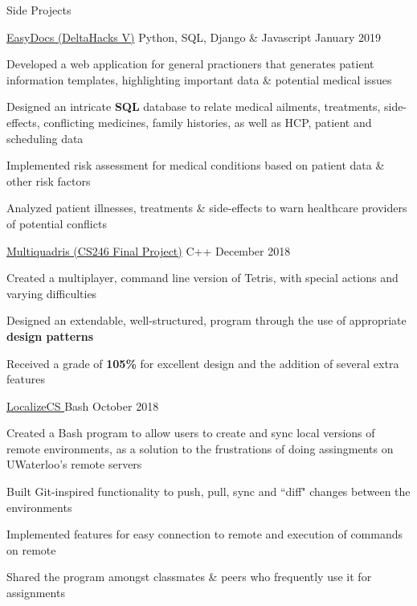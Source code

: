 \documentclass{resume} %
\begin{document}

\begin{rSection}{Side Projects}
    
    \begin{sideproject}
        {\href{https://github.com/wbhildeb/EasyDocs}{\faGithub{} EasyDocs (DeltaHacks V)}}
        {Python, SQL, Django \& Javascript}
        {January 2019}
        {
            \item Developed a web application for general practioners that generates patient information templates, highlighting important data \& potential medical issues
            \item Designed an intricate \textbf{SQL} database to relate medical ailments, treatments, side-effects, conflicting medicines, family histories, as well as HCP, patient and scheduling data
            \item Implemented risk assessment for medical conditions based on patient data \& other risk factors
            \item Analyzed patient illnesses, treatments \& side-effects to warn healthcare providers of potential conflicts
        }
    \end{sideproject}

    \begin{sideproject}
        {\href{https://github.com/wbhildeb/Multiquadris}{\faGithub{} Multiquadris (CS246 Final Project)}}
        {C++}
        {December 2018}
        {
            \item Created a multiplayer, command line version of Tetris, with special actions and varying difficulties
            \item Designed an extendable, well-structured, program through the use of appropriate \textbf{design patterns}
            \item Received a grade of \textbf{105\%} for excellent design and the addition of several extra features
        }
    \end{sideproject}

    \begin{sideproject}
        {\href{https://github.com/wbhildeb/localize-cs}{\faGithub{} LocalizeCS }}
        {Bash}
        {October 2018}
        {
            \item Created a Bash program to allow users to create and sync local versions of remote environments, as
            a solution to the frustrations of doing assingments on UWaterloo's remote servers
            \item Built Git-inspired functionality to push, pull, sync and ``diff" changes between the environments
            \item Implemented features for easy connection to remote and execution of commands on remote
            \item Shared the program amongst classmates \& peers who frequently use it for assignments
        }
    \end{sideproject}


\end{rSection}
\end{document}
